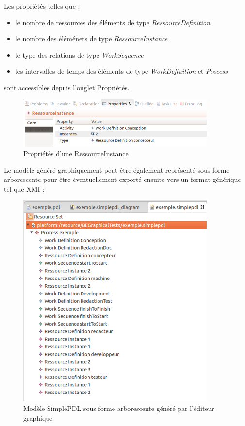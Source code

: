 \documentclass{report}
\begin{document}
Les propriétés telles que :
\begin{itemize}
\item le nombre de ressources des éléments de type \textit{RessourceDefinition}
\item le nombre des éléménets de type \textit{RessourceInstance}
\item le type des relations de type \textit{WorkSequence}
\item les intervalles de temps des éléments de type \textit{WorkDefinition} et \textit{Process}
\end{itemize}
sont accessibles depuis l'onglet Propriétés.

\begin{figure}[!h] 
\begin{center}
\includegraphics[width=10cm]{Capture-10.png}
\caption{Propriétés d'une RessourceInstance} 
\label{img1} 
\end{center}
\end{figure} 

Le modèle généré graphiquement peut être également représenté sous forme arborescente pour être éventuellement exporté ensuite vers un format générique tel que XMI :

\begin{figure}[!h] 
\begin{center}
\includegraphics[width=10cm]{Capture-9.png}
\caption{Modèle SimplePDL sous forme arborescente généré par l'éditeur graphique} 
\label{img1} 
\end{center}
\end{figure} 
\end{document}
